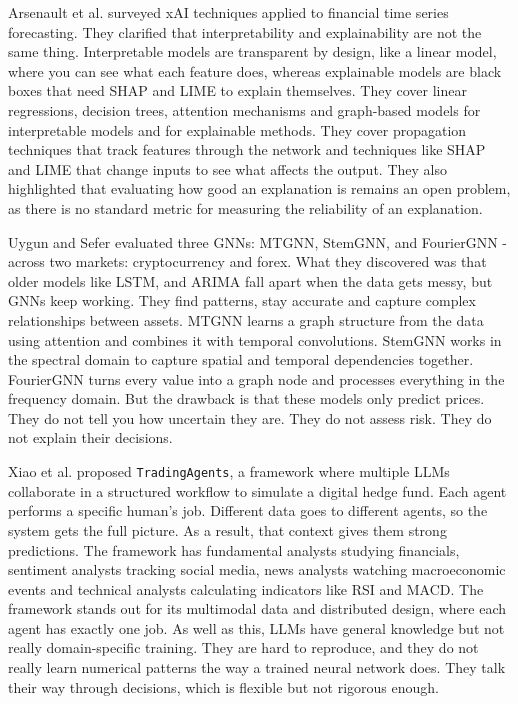 \documentclass[conference]{IEEEtran}
\begin{document}
Arsenault et al.\cite{12thPaper} surveyed xAI techniques applied to financial time series forecasting. They clarified that interpretability and explainability are not the same thing. Interpretable models are transparent by design, like a linear model, where you can see what each feature does, whereas explainable models are black boxes that need SHAP and LIME to explain themselves.  They cover linear regressions, decision trees, attention mechanisms and graph-based models for interpretable models and for explainable methods. They cover propagation techniques that track features through the network and techniques like SHAP\cite{SHAP} and LIME\cite{LIME} that change inputs to see what affects the output. They also highlighted that evaluating how good an explanation is remains an open problem, as there is no standard metric for measuring the reliability of an explanation.

Uygun and Sefer\cite{13thPaper} evaluated three GNNs: MTGNN\cite{MTGNN}, StemGNN\cite{StemGNN}, and FourierGNN\cite{FourierGNN} - across two markets: cryptocurrency and forex. What they discovered was that older models like LSTM\cite{LSTM}, and ARIMA\cite{ARIMA} fall apart when the data gets messy, but GNNs keep working. They find patterns, stay accurate and capture complex relationships between assets. MTGNN\cite{MTGNN} learns a graph structure from the data using attention and combines it with temporal convolutions. StemGNN\cite{StemGNN} works in the spectral domain to capture spatial and temporal dependencies together. FourierGNN\cite{FourierGNN} turns every value into a graph node and processes everything in the frequency domain. But the drawback is that these models only predict prices. They do not tell you how uncertain they are. They do not assess risk. They do not explain their decisions.  

Xiao et al.\cite{1stPaper} proposed \texttt{TradingAgents}, a framework where multiple LLMs collaborate in a structured workflow to simulate a digital hedge fund. Each agent performs a specific human's job. Different data goes to different agents, so the system gets the full picture. As a result, that context gives them strong predictions. The framework has fundamental analysts studying financials, sentiment analysts tracking social media, news analysts watching macroeconomic events and technical analysts calculating indicators like RSI and MACD. The framework stands out for its multimodal data and distributed design, where each agent has exactly one job. As well as this, LLMs have general knowledge but not really domain-specific training. They are hard to reproduce, and they do not really learn numerical patterns the way a trained neural network does. They talk their way through decisions, which is flexible but not rigorous enough. 
 
\end{document}
